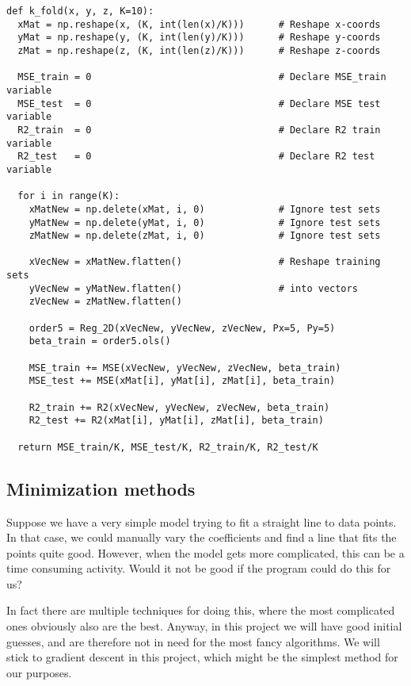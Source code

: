 \lstset{basicstyle=\scriptsize}
\begin{lstlisting}
def k_fold(x, y, z, K=10):
  xMat = np.reshape(x, (K, int(len(x)/K)))      # Reshape x-coords
  yMat = np.reshape(y, (K, int(len(y)/K)))      # Reshape y-coords
  zMat = np.reshape(z, (K, int(len(z)/K)))      # Reshape z-coords
	
  MSE_train = 0	                                # Declare MSE_train variable
  MSE_test  = 0	                                # Declare MSE test variable
  R2_train  = 0	                                # Declare R2 train variable
  R2_test   = 0                                 # Declare R2 test variable
	
  for i in range(K):
    xMatNew = np.delete(xMat, i, 0)             # Ignore test sets
    yMatNew = np.delete(yMat, i, 0)             # Ignore test sets
    zMatNew = np.delete(zMat, i, 0)             # Ignore test sets
		
    xVecNew = xMatNew.flatten()                 # Reshape training sets
    yVecNew = yMatNew.flatten()                 # into vectors
    zVecNew = zMatNew.flatten()
		
    order5 = Reg_2D(xVecNew, yVecNew, zVecNew, Px=5, Py=5)
    beta_train = order5.ols()
		
    MSE_train += MSE(xVecNew, yVecNew, zVecNew, beta_train)
    MSE_test += MSE(xMat[i], yMat[i], zMat[i], beta_train)
		
    R2_train += R2(xVecNew, yVecNew, zVecNew, beta_train)
    R2_test += R2(xMat[i], yMat[i], zMat[i], beta_train)
	
  return MSE_train/K, MSE_test/K, R2_train/K, R2_test/K
\end{lstlisting}

\subsection{Minimization methods} \label{sec:minimization}
Suppose we have a very simple model trying to fit a straight line to data points. In that case, we could manually vary the coefficients and find a line that fits the points quite good. However, when the model gets more complicated, this can be a time consuming activity. Would it not be good if the program could do this for us?

In fact there are multiple techniques for doing this, where the most complicated ones obviously also are the best. Anyway, in this project we will have good initial guesses, and are therefore not in need for the most fancy algorithms. We will stick to gradient descent in this project, which might be the simplest method for our purposes.

